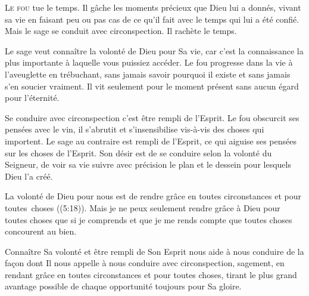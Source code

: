 


\lettrine{L}{e fou} tue le temps.
 Il gâche les moments précieux que Dieu lui a donnés,
 vivant sa vie en faisant peu ou pas cas de ce qu'il fait
 avec le temps qui lui a été confié.
 Mais le sage se conduit avec circonspection. Il rachète le temps.

Le sage veut connaître la volonté de Dieu pour Sa vie,
 car c'est la connaissance la plus importante à laquelle vous puissiez accéder.
 Le fou progresse dans la vie à l'aveuglette en trébuchant,
 sans jamais savoir pourquoi il existe et sans jamais s'en soucier vraiment.
 Il vit seulement pour le moment présent sans aucun égard pour l'éternité.


Se conduire avec circonspection c'est être rempli de l'Esprit.
 Le fou obscurcit ses pensées avec le vin, il s'abrutit et s'insensibilise
 vis-à-vis des choses qui importent. Le sage au contraire est rempli
 de l'Esprit, ce qui aiguise ses pensées sur les choses de l'Esprit.
 Son désir est de se conduire selon la volonté du Seigneur, 
 de voir sa vie suivre avec précision le plan et le dessein
 pour lesquels Dieu l'a créé.

La volonté de Dieu pour nous est de rendre grâce en toutes circonstances
 et pour toutes~choses ((5:18)).
 Mais je ne peux seulement rendre grâce à Dieu pour toutes choses
 que si je comprends et que je me rends compte que toutes choses
 concourent au bien.

Connaître Sa volonté et être rempli de Son Esprit nous aide 
 à nous conduire de la fa\c{c}on dont Il nous appelle à nous conduire
 \ocadr avec circonspection, sagement, en rendant grâce en toutes circonstances
 et pour toutes choses, tirant le plus grand avantage possible
 de chaque opportunité \fcadr{} toujours pour Sa gloire.

\dvrule





